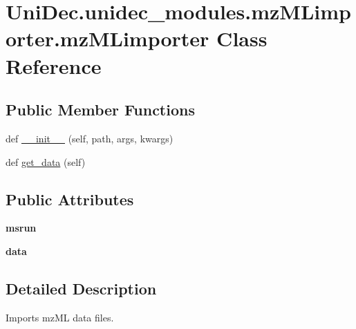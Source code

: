 \hypertarget{class_uni_dec_1_1unidec__modules_1_1mz_m_limporter_1_1mz_m_limporter}{}\section{Uni\+Dec.\+unidec\+\_\+modules.\+mz\+M\+Limporter.\+mz\+M\+Limporter Class Reference}
\label{class_uni_dec_1_1unidec__modules_1_1mz_m_limporter_1_1mz_m_limporter}
\subsection*{Public Member Functions}
\begin{DoxyCompactItemize}
\item 
def \hyperlink{class_uni_dec_1_1unidec__modules_1_1mz_m_limporter_1_1mz_m_limporter_a0ca891290b46edbb2c1fbfc9c436f1eb}{\+\_\+\+\_\+init\+\_\+\+\_\+} (self, path, args, kwargs)
\item 
def \hyperlink{class_uni_dec_1_1unidec__modules_1_1mz_m_limporter_1_1mz_m_limporter_a17097a5a09b98a832f5e3eaea230d2d3}{get\+\_\+data} (self)
\end{DoxyCompactItemize}
\subsection*{Public Attributes}
\begin{DoxyCompactItemize}
\item 
\hypertarget{class_uni_dec_1_1unidec__modules_1_1mz_m_limporter_1_1mz_m_limporter_ade9fc5a572dae0b438c7e27000391950}{}{\bfseries msrun}\label{class_uni_dec_1_1unidec__modules_1_1mz_m_limporter_1_1mz_m_limporter_ade9fc5a572dae0b438c7e27000391950}

\item 
\hypertarget{class_uni_dec_1_1unidec__modules_1_1mz_m_limporter_1_1mz_m_limporter_a54420688600df621e32b81d9e3aa3a77}{}{\bfseries data}\label{class_uni_dec_1_1unidec__modules_1_1mz_m_limporter_1_1mz_m_limporter_a54420688600df621e32b81d9e3aa3a77}

\end{DoxyCompactItemize}


\subsection{Detailed Description}
\begin{DoxyVerb}Imports mzML data files.
\end{DoxyVerb}
 

